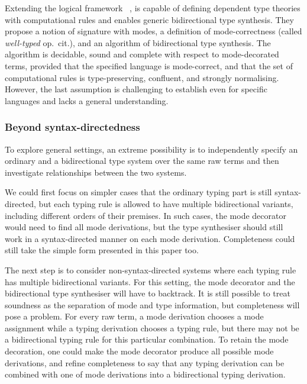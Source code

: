 Extending the logical framework \Dedukti~\cite{Assaf2016},  is capable of defining dependent type theories with computational rules and enables generic bidirectional type synthesis.
They propose a notion of \LF signature with modes, a definition of mode-correctness (called \emph{well-typed} op.\ cit.), and an algorithm of bidirectional type synthesis.
The algorithm is decidable, sound and complete with respect to mode-decorated terms, provided that the specified language is mode-correct, and that the set of computational rules is type-preserving, confluent, and strongly normalising.
However, the last assumption is challenging to establish even for specific languages and lacks a general understanding.

\subsubsection{Beyond syntax-directedness}

To explore general settings, an extreme possibility is to independently specify an ordinary and a bidirectional type system over the same raw terms and then investigate relationships between the two systems.

We could first focus on simpler cases that the ordinary typing part is still syntax-directed, but each typing rule is allowed to have multiple bidirectional variants, including different orders of their premises.
In such cases, the mode decorator would need to find all mode derivations, but the type synthesiser should still work in a syntax-directed manner on each mode derivation.
Completeness could still take the simple form presented in this paper too.

The next step is to consider non-syntax-directed systems where each typing rule has multiple bidirectional variants.
For this setting, the mode decorator and the bidirectional type synthesiser will have to backtrack.
It is still possible to treat soundness as the separation of mode and type information, but completeness will pose a problem.
For every raw term, a mode derivation chooses a mode assignment while a typing derivation chooses a typing rule, but there may not be a bidirectional typing rule for this particular combination.
To retain the mode decoration, one could make the mode decorator produce all possible mode derivations, and refine completeness to say that any typing derivation can be combined with one of mode derivations into a bidirectional typing derivation.



